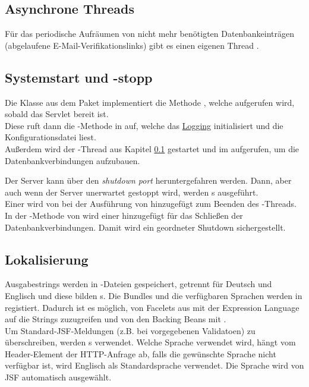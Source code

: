 \subsection{Asynchrone Threads}\label{subsec:threads}
Für das periodische Aufräumen von nicht mehr benötigten Datenbankeinträgen (abgelaufene E-Mail-Verifikationslinks) gibt es einen eigenen Thread .

\subsection{Systemstart und -stopp}\label{subsec:systemstart}
Die Klasse  aus dem Paket  implementiert die Methode , welche aufgerufen wird, sobald das Servlet bereit ist.
\\
Diese ruft dann die -Methode in  auf, welche
 das \hyperref[subsec:logging]{Logging} initialisiert und die Konfigurationsdatei liest.
\\
Außerdem wird der -Thread aus Kapitel \ref{subsec:threads} gestartet und im   aufgerufen, um die Datenbankverbindungen aufzubauen.

Der Server kann über den \emph{shutdown port} heruntergefahren werden.
Dann, aber auch wenn der Server unerwartet gestoppt wird, werden s ausgeführt.
\\
Einer wird von  bei der Ausführung von  hinzugefügt zum Beenden des -Threads.
In der -Methode von  wird einer hinzugefügt für das Schließen der Datenbankverbindungen.
Damit wird ein geordneter Shutdown sichergestellt.

\subsection{Lokalisierung}\label{subsec:lokalisierung}
Ausgabestrings werden in -Dateien gespeichert, getrennt für Deutsch und Englisch und diese bilden s.
Die Bundles und die verfügbaren Sprachen werden in  registiert.
Dadurch ist es möglich, von Facelets aus mit der Expression Language auf die Strings zuzugreifen und von den Backing Beans mit .
\\
Um Standard-JSF-Meldungen (z.B. bei vorgegebenen Validatoen) zu überschreiben, werden s verwendet.
Welche Sprache verwendet wird, hängt vom Header-Element  der HTTP-Anfrage ab, falls die gewünschte Sprache nicht verfügbar ist, wird Englisch als Standardsprache verwendet.
Die Sprache wird von JSF automatisch ausgewählt.

